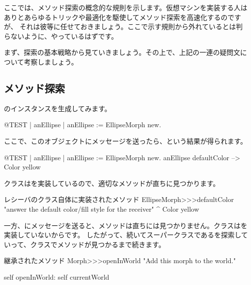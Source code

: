 \documentclass[a4paper,10pt,twoside]{book}
\begin{document}
ここでは、メソッド探索の概念的な規則を示します。仮想マシンを実装する人はありとあらゆるトリックや最適化を駆使してメソッド探索を高速化するのですが、
それは彼等に任せておきましょう。ここで示す規則から外れているとは判らないように、やっているはずです。

まず、探索の基本戦略から見ていきましょう。その上で、上記の一連の疑問文について考察しましょう。

\subsection{メソッド探索}
のインスタンスを生成してみます。
\begin{code}{@TEST | anEllipse |}
anEllipse := EllipseMorph new.
\end{code}
\noindent
ここで、このオブジェクトにメッセージを送ったら、という結果が得られます。
\begin{code}{@TEST | anEllipse | anEllipse := EllipseMorph new.}
anEllipse defaultColor --> Color yellow
\end{code}
\noindent
{}クラスはを実装しているので、適切なメソッドが直ちに見つかります。

\begin{method}[defaultColor]{レシーバのクラス自体に実装されたメソッド}
EllipseMorph>>>defaultColor
	"answer the default color/fill style for the receiver"
	^ Color yellow
\end{method}

一方、にメッセージを送ると、メソッドは直ちには見つかりません。クラスはを実装していないからです。
したがって、続いてスーパークラスであるを探索していって、クラスでメソッドが見つかるまで続きます。

\begin{method}[openInWorld]{継承されたメソッド}
Morph>>>openInWorld
	"Add this morph to the world."

	self openInWorld: self currentWorld
\end{method}
\end{document}
